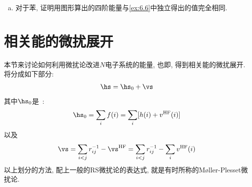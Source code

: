 {\begin{enumerate}[a.]
\begin{equation*}
\begin{tikzpicture}[baseline={(current bounding box.center)}, postaction={on each segment={mid arrow}},scale=.6]
			\path [draw=blue,postaction={on each segment={mid arrow}}]
			(8,-7.) node{\dian}
			arc (-45:15:2.12cm)node[right,midway]{r} node{\dian} arc(-15:-45:2.12cm)node[left,midway]{b} node{\dian} arc(225:180:2.57cm)node[right,midway]{s} node{\dian} to [bend right] node[left,midway]{a} (8,-7.);
		\end{tikzpicture}
		=
		\begin{tikzpicture}[baseline={(current bounding box.center)}, postaction={on each segment={mid arrow}},scale=.6]
		\path [draw=blue,postaction={on each segment={mid reverse arrow}}]
		(10,-7.) node{\dian}
		arc (-45:15:2.12cm)node[right,midway]{b} node{\dian} arc(-15:-45:2.12cm)node[left,midway]{s} node{\dian} arc(225:180:2.57cm)node[right,midway]{a} node{\dian} to [bend right] node[left,midway]{r} (10,-7.);
		\end{tikzpicture}
		=-\frac{3N\beta}{128}
		\end{equation*}
		继而有
		\begin{equation*}
		E_0^{(4)} = \frac{N\beta}{64}
		\end{equation*}
		因此环多烯（$N>6$）的共振能算到第四阶就是$(1/4+1/64)N\beta=0.2656 N\beta$, 和渐近的精确值$0.2732\beta$相比非常接近（占97\%）. 
	\item 对于苯, 证明用图形算出的四阶能量与\autoref{ex:6.6}中独立得出的值完全相同. 
\end{enumerate}
}


\section{相关能的微扰展开}
\label{sec6.5}
本节来讨论如何利用微扰论改进$N$电子系统的\hft 能量, 
也即, 
得到相关能的微扰展开. 
将\ha 分成如下部分:
\begin{align}
\hs=\hs_0+\vs
\end{align} 
其中$\hs_0$是\hft\ \ha:
\begin{align}
\hs_0=\sum_{i} f(i) = \sum_{i}[h(i)+v^\mathrm{HF}(i)]
\end{align}
以及
\begin{align}
\vs = \sum_{i<j}r_{ij}^{-1} - \vs^\mathrm{HF} =  \sum_{i<j}r_{ij}^{-1} - \sum_{i}v^\mathrm{HF}(i)
\end{align}
以上划分\ha 的方法, 
配上一般的RS微扰论的表达式, 
就是有时所称的{M{\o}ller-Plesset}微扰论.


